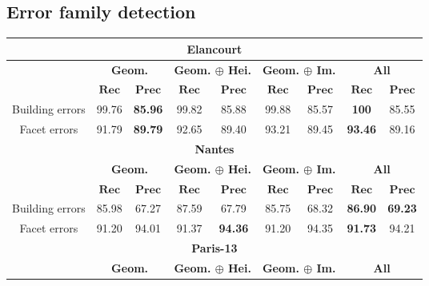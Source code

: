     \subsection{Error family detection}
        \label{subsec::more_experiments::finesse::2}
        \begin{table}[htbp]
            \footnotesize
            \centering
            \begin{tabular}{|c | c c | c c | c c | c c |}
                \hline
                \multicolumn{9}{|c|}{\textbf{Elancourt}}\\
                \hline
                &\multicolumn{2}{c|}{\textbf{Geom.}} & \multicolumn{2}{c|}{\textbf{Geom. \(\oplus\) Hei.}} & \multicolumn{2}{c|}{\textbf{Geom. \(\oplus\) Im.}} & \multicolumn{2}{x{1.8cm}|}{\textbf{All}}\\
                \cline{2-9}
                & \(\bm{Rec}\) & \(\bm{Prec}\) &  \(\bm{Rec}\) & \(\bm{Prec}\) &  \(\bm{Rec}\) & \(\bm{Prec}\) &  \(\bm{Rec}\) & \(\bm{Prec}\) \\
                \hline
                Building errors & 99.76 & \textbf{85.96} & 99.82 & 85.88 & 99.88 & 85.57 & \textbf{100} & 85.55 \\
                \hline
                Facet errors & 91.79 & \textbf{89.79} & 92.65 & 89.40 & 93.21 & 89.45 & \textbf{93.46} & 89.16 \\
                \hline
                \hline
                \multicolumn{9}{|c|}{\textbf{Nantes}}\\
                \hline
                &\multicolumn{2}{c|}{\textbf{Geom.}} & \multicolumn{2}{c|}{\textbf{Geom. \(\oplus\) Hei.}} & \multicolumn{2}{c|}{\textbf{Geom. \(\oplus\) Im.}} & \multicolumn{2}{x{1.8cm}|}{\textbf{All}}\\
                \cline{2-9}
                & \(\bm{Rec}\) & \(\bm{Prec}\) &  \(\bm{Rec}\) & \(\bm{Prec}\) &  \(\bm{Rec}\) & \(\bm{Prec}\) &  \(\bm{Rec}\) & \(\bm{Prec}\) \\
                \hline
                Building errors & 85.98 & 67.27 & 87.59 & 67.79 & 85.75 & 68.32 & \textbf{86.90} & \textbf{69.23} \\
                \hline
                Facet errors & 91.20 & 94.01 & 91.37 & \textbf{94.36} & 91.20 & 94.35 & \textbf{91.73} & 94.21\\
                \hline
                \hline
                \multicolumn{9}{|c|}{\textbf{Paris-13}}\\
                \hline
                &\multicolumn{2}{c|}{\textbf{Geom.}} & \multicolumn{2}{c|}{\textbf{Geom. \(\oplus\) Hei.}} & \multicolumn{2}{c|}{\textbf{Geom. \(\oplus\) Im.}} & \multicolumn{2}{x{1.8cm}|}{\textbf{All}}\\

\end{tabular}
\end{table}
